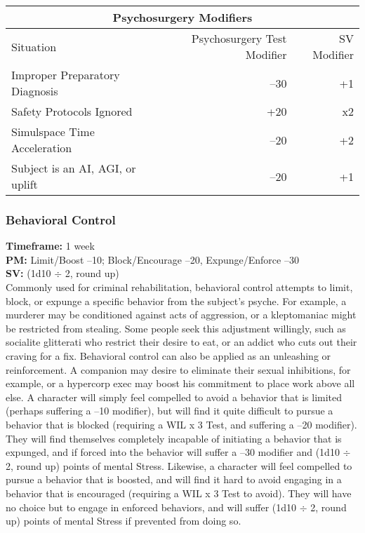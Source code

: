 \begin{table}
\begin{tabular}{|l|r|r|}
\hline
\multicolumn{3}{|c|}{\textbf{Psychosurgery Modifiers}} \\
\hline
Situation & Psychosurgery Test Modifier & SV Modifier \\
\hline
Improper Preparatory Diagnosis & –30 & +1 \\
\hline
Safety Protocols Ignored & +20 & x2 \\
\hline
Simulspace Time Acceleration & –20 & +2 \\
\hline
Subject is an AI, AGI, or uplift & –20 & +1 \\
\hline
\end{tabular}
\label{tab:psychosurgery-modifiers}
\end{table}

\subsubsection{Behavioral Control}
\textbf{Timeframe:} 1 week \\
\textbf{PM:} Limit/Boost –10; Block/Encourage –20, Expunge/Enforce –30 \\
\textbf{SV:} (1d10 $\div$ 2, round up) \\
Commonly used for criminal rehabilitation, behavioral
control attempts to limit, block, or expunge a
specific behavior from the subject’s psyche. For example,
a murderer may be conditioned against acts of aggression,
or a kleptomaniac might be restricted from
stealing. Some people seek this adjustment willingly,
such as socialite glitterati who restrict their desire to
eat, or an addict who cuts out their craving for a fix.
Behavioral control can also be applied as an unleashing
or reinforcement. A companion may desire
to eliminate their sexual inhibitions, for example, or
a hypercorp exec may boost his commitment to place
work above all else.
A character will simply feel compelled to avoid
a behavior that is limited (perhaps suffering a –10
modifier), but will find it quite difficult to pursue a behavior
that is blocked (requiring a WIL x 3 Test, and
suffering a –20 modifier). They will find themselves
completely incapable of initiating a behavior that is
expunged, and if forced into the behavior will suffer
a –30 modifier and (1d10 $\div$ 2, round up) points of
mental Stress.
Likewise, a character will feel compelled to pursue a
behavior that is boosted, and will find it hard to avoid
engaging in a behavior that is encouraged (requiring a
WIL x 3 Test to avoid). They will have no choice but
to engage in enforced behaviors, and will suffer (1d10
$\div$ 2, round up) points of mental Stress if prevented
from doing so.

